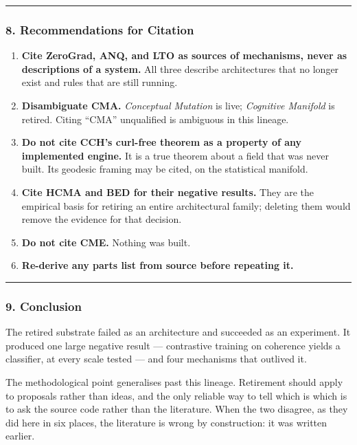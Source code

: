 \documentclass[
  11pt,
  a4paper,
]{article}
\providecommand{\tightlist}{%
  \setlength{\itemsep}{0pt}\setlength{\parskip}{0pt}}
\begin{document}
\begin{center}\rule{0.5\linewidth}{0.5pt}\end{center}

\subsubsection{8. Recommendations for
Citation}\label{recommendations-for-citation}

\begin{enumerate}
\def\labelenumi{\arabic{enumi}.}
\tightlist
\item
  \textbf{Cite ZeroGrad, ANQ, and LTO as sources of mechanisms, never as
  descriptions of a system.} All three describe architectures that no
  longer exist and rules that are still running.
\item
  \textbf{Disambiguate CMA.} \emph{Conceptual Mutation} is live;
  \emph{Cognitive Manifold} is retired. Citing ``CMA'' unqualified is
  ambiguous in this lineage.
\item
  \textbf{Do not cite CCH's curl-free theorem as a property of any
  implemented engine.} It is a true theorem about a field that was never
  built. Its geodesic framing may be cited, on the statistical manifold.
\item
  \textbf{Cite HCMA and BED for their negative results.} They are the
  empirical basis for retiring an entire architectural family; deleting
  them would remove the evidence for that decision.
\item
  \textbf{Do not cite CME.} Nothing was built.
\item
  \textbf{Re-derive any parts list from source before repeating it.}
\end{enumerate}

\begin{center}\rule{0.5\linewidth}{0.5pt}\end{center}

\subsubsection{9. Conclusion}\label{conclusion}

The retired substrate failed as an architecture and succeeded as an
experiment. It produced one large negative result --- contrastive
training on coherence yields a classifier, at every scale tested --- and
four mechanisms that outlived it.

The methodological point generalises past this lineage. Retirement
should apply to proposals rather than ideas, and the only reliable way
to tell which is which is to ask the source code rather than the
literature. When the two disagree, as they did here in six places, the
literature is wrong by construction: it was written earlier.
\end{document}

